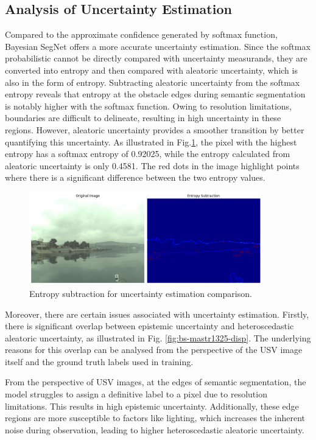 \subsection{Analysis of Uncertainty Estimation}
\label{section:AUE}
Compared to the approximate confidence generated by softmax function, Bayesian SegNet offers a more accurate 
uncertainty estimation. Since the softmax probabilistic cannot be directly compared with uncertainty measurands, 
they are converted into entropy and then compared with aleatoric uncertainty, which is also in the form of entropy. 
Subtracting aleatoric uncertainty from the softmax entropy reveals that entropy at the obstacle edges during semantic 
segmentation is notably higher with the softmax function. Owing to resolution limitations, boundaries are difficult 
to delineate, resulting in high uncertainty in these regions. However, aleatoric uncertainty provides a smoother 
transition by better quantifying this uncertainty. As illustrated in Fig.\ref{fig:entropy}, the pixel with the 
highest entropy has a softmax entropy of 0.92025, while the entropy calculated from aleatoric uncertainty is only 
0.4581. The red dots in the image highlight points where there is a significant difference between the two entropy 
values.
\begin{figure}[ht!]
    \centering
        \centering
        \includegraphics[width=0.9\textwidth]{figures/MaSTr1325/entropy.png}
    \caption{Entropy subtraction for uncertainty estimation comparison.}
    \label{fig:entropy}
\end{figure}

Moreover, there are certain issues associated with uncertainty estimation. Firstly, there is significant overlap 
between epistemic uncertainty and heteroscedastic aleatoric uncertainty, as illustrated in Fig.
\ref{fig:bs-mastr1325-disp}. The underlying reasons for this overlap can be analysed from the perspective of the 
USV image itself and the ground truth labels used in training. 

From the perspective of USV images, at the edges of semantic segmentation, the model struggles to assign a 
definitive label to a pixel due to resolution limitations. This results in high epistemic uncertainty. 
Additionally, these edge regions are more susceptible to factors like lighting, which increases the inherent 
noise during observation, leading to higher heteroscedastic aleatoric uncertainty.

